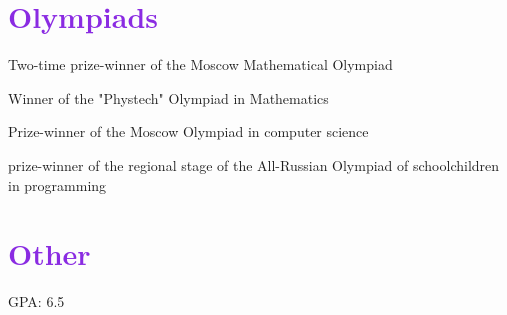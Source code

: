 \documentclass[letterpaper,11pt]{article}
\makeatletter
\newcommand{\resumeItem}[1]{
  \item\small{
    {#1 \vspace{-2pt}}
  }
}
\newcommand{\resumeSubheading}[4]{
  \vspace{-2pt}\item
    \begin{tabular*}{1.0\textwidth}[t]{l@{\extracolsep{\fill}}r}
      \textbf{#1} & \textbf{\small #2} \\
      \textit{\small#3} & \textit{\small #4} \\
    \end{tabular*}\vspace{-7pt}
}
\newcommand{\resumeSubHeadingListStart}{\begin{itemize}[leftmargin=0.0in, label={}]}
\newcommand{\resumeItemListStart}{\begin{itemize}}
\newcommand{\resumeItemListEnd}{\end{itemize}\vspace{-5pt}}
\makeatother
\begin{document}
\section{\textcolor{BlueViolet}{Olympiads}}
 \begin{itemize}[leftmargin=0.15in]
    {\item{
        { Two-time prize-winner of the Moscow Mathematical Olympiad} \\
    }}
    {\item{
        { Winner of the "Phystech" Olympiad in Mathematics } \\
    }}
    {\item{
        { Prize-winner of the Moscow Olympiad in computer science } \\
    }}
    {\item{
        { prize-winner of the regional stage of the All-Russian Olympiad of schoolchildren in programming } \\
    }}
 \end{itemize}
 \vspace{-16pt}

\section{\textcolor{BlueViolet}{Other}}
 \begin{itemize}[leftmargin=0.15in]
    {\item{
        { GPA: 6.5} \\
    }}
 \end{itemize}
 \vspace{-16pt}

        
\end{document}
